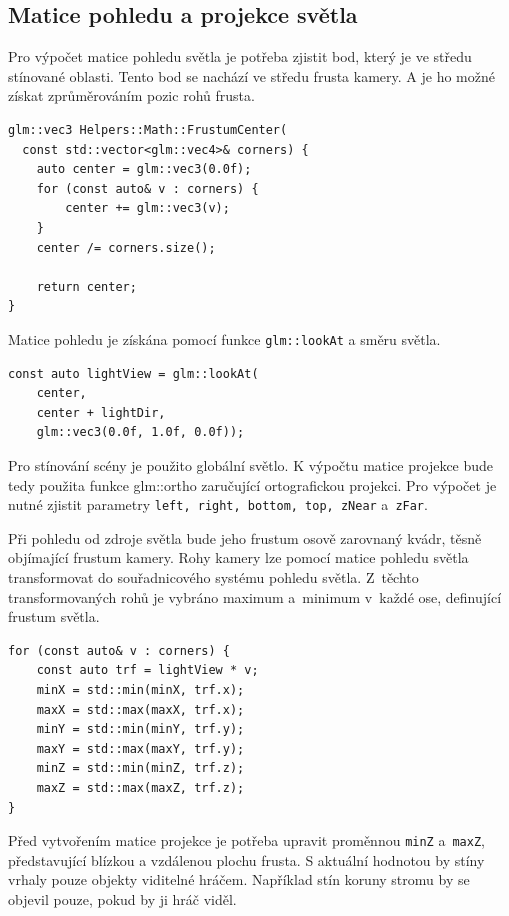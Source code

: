 \documentclass[thesis=M,czech]{FITthesis}[2019/12/23]
\begin{document}
\subsection{Matice pohledu a projekce světla}

Pro výpočet matice pohledu světla je potřeba zjistit bod, který je ve středu stínované oblasti. Tento bod se nachází ve středu frusta kamery. A je ho možné získat zprůměrováním pozic rohů frusta.

\begin{verbatim}
glm::vec3 Helpers::Math::FrustumCenter(
  const std::vector<glm::vec4>& corners) {
    auto center = glm::vec3(0.0f);
    for (const auto& v : corners) {
        center += glm::vec3(v);
    }
    center /= corners.size();

    return center;
}
\end{verbatim}

Matice pohledu je získána pomocí funkce \texttt{glm::lookAt} a směru světla.

\begin{verbatim}
const auto lightView = glm::lookAt(
    center,
    center + lightDir,
    glm::vec3(0.0f, 1.0f, 0.0f));
\end{verbatim}

Pro stínování scény je použito globální světlo. K výpočtu matice projekce bude tedy použita funkce glm::ortho zaručující ortografickou projekci. Pro výpočet je nutné zjistit parametry \texttt{left, right, bottom, top, zNear} a~\texttt{zFar}.

Při pohledu od zdroje světla bude jeho frustum osově zarovnaný kvádr, těsně objímající frustum kamery. Rohy kamery lze pomocí matice pohledu světla transformovat do souřadnicového systému pohledu světla. Z~těchto transformovaných rohů je vybráno maximum a~minimum v~každé ose, definující frustum světla.

\begin{verbatim}
for (const auto& v : corners) {
    const auto trf = lightView * v;
    minX = std::min(minX, trf.x);
    maxX = std::max(maxX, trf.x);
    minY = std::min(minY, trf.y);
    maxY = std::max(maxY, trf.y);
    minZ = std::min(minZ, trf.z);
    maxZ = std::max(maxZ, trf.z);
}
\end{verbatim}

Před vytvořením matice projekce je potřeba upravit proměnnou \texttt{minZ} a~\texttt{maxZ}, představující blízkou a vzdálenou plochu frusta. S aktuální hodnotou by stíny vrhaly pouze objekty viditelné hráčem. Například stín koruny stromu by se objevil pouze, pokud by ji hráč viděl.
\end{document}
